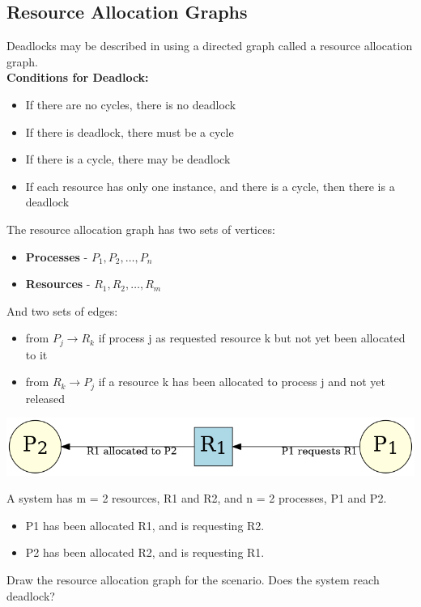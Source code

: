 \documentclass[a4paper, 10pt]{article}
\begin{document}
\subsection{Resource Allocation Graphs}
Deadlocks may be described in using a directed graph called a resource allocation graph. \\[2ex]
\textbf{Conditions for Deadlock:}
\begin{itemize}
    \item If there are no cycles, there is no deadlock
    \item If there is deadlock, there must be a cycle
    \item If there is a cycle, there may be deadlock
    \item If each resource has only one instance, and there is a cycle, then there is a  deadlock
\end{itemize}
The resource allocation graph has two sets of vertices:
\begin{itemize}
    \item \textbf{Processes} - $P_1, P_2, \dots, P_n$
    \item \textbf{Resources} - $R_1, R_2, \dots, R_m$
\end{itemize}
And two sets of edges:
\begin{itemize}
    \item from $P_j \to R_k$ if process j as requested resource k but not yet been allocated to it
    \item from $R_k \to P_j$ if a resource k has been allocated to process j and not yet released
\end{itemize}
\begin{center}
    \includegraphics[scale = 0.5]{images/resourceAllocationGraph.png}
\end{center}
\begin{examplebox}{}{}
    A system has m = 2 resources, R1 and R2, and n = 2 processes, P1 and P2.
    \begin{itemize}
        \item P1 has been allocated R1, and is requesting R2.
        \item P2 has been allocated R2, and is requesting R1.
    \end{itemize}
    Draw the resource allocation graph for the scenario. Does the system reach deadlock?
\end{examplebox}
\end{document}
